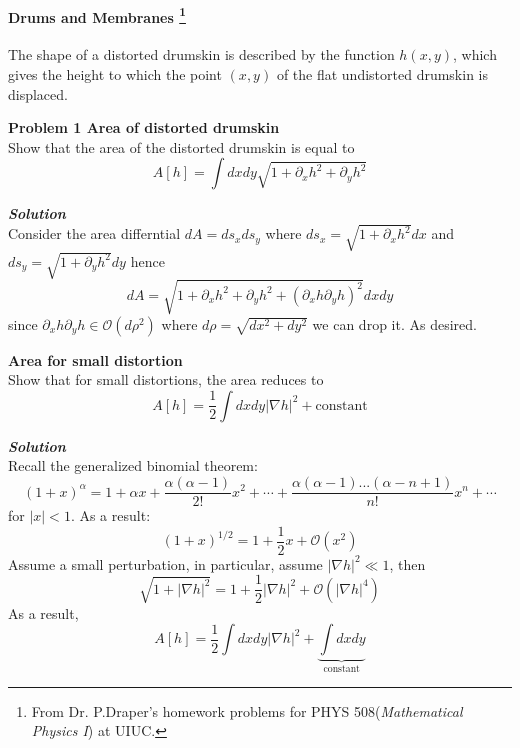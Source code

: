 \paragraph{Drums and Membranes \footnote{From Dr. P.Draper's homework problems for PHYS 508(\textit{Mathematical Physics I}) at UIUC.}}

The shape of a distorted drumskin is described by the
function $h(x, y)$, which gives the height to which the point $(x, y)$ of the flat undistorted drumskin is displaced.

\begin{framed}
\textbf{\textbf{Problem 1} Area of distorted drumskin}\\
Show that the area of the distorted drumskin is equal to
\begin{equation}
A[h] = \int dxdy \sqrt{1 + \partial_x h^2 + \partial_y h^2}
\end{equation}
\end{framed}

\begin{framed}
\textbf{\textit{Solution}}\\
Consider the area differntial $dA=ds_x ds_y$ where $ds_x=\sqrt{1+\partial_x h^2}dx$ and $ds_y=\sqrt{1+\partial_y h^2}dy$ hence
\begin{equation}
dA=\sqrt{1+\partial_x h^2 + \partial_y h^2 + (\partial_x h\partial_y h)^2}dxdy
\end{equation}
since $\partial_x h\partial_y h\in \mathcal{O}(d\rho^2)$ where $d\rho = \sqrt{dx^2 + dy^2}$ we can drop it. As desired.
\end{framed}

\begin{framed}
\textbf{Area for small distortion}\\
Show that for small distortions, the area reduces to
\begin{equation}
\label{afsd}
   A[h]=\frac{1}{2}\int dxdy |\nabla h|^2 + \text{constant}
\end{equation}
\end{framed}

\begin{framed}
\textbf{\textit{Solution}}\\
Recall the generalized binomial theorem:
\begin{equation}
(1+x)^{\alpha}=1+\alpha x + \frac{\alpha(\alpha-1)}{2!}x^2+\cdots + \frac{\alpha(\alpha-1)...(\alpha-n+1)}{n!}x^n + \cdots
\end{equation}
for $|x|<1$.
As a result:
\begin{equation}
(1+x)^{1/2}=1+\frac12 x + \mathcal{O}(x^2)
\end{equation}
Assume a small perturbation, in particular, assume $|\nabla h|^2 \ll 1$, then
\begin{equation}
\sqrt{1+|\nabla h|^2} = 1 + \frac12 |\nabla h|^2 +  \mathcal{O}(|\nabla h|^4)
\end{equation}
As a result,
\begin{equation}
A[h]=\frac12 \int dxdy |\nabla h|^2 + \underbrace{\int dxdy}_{\text{constant}}
\end{equation}
\end{framed}

